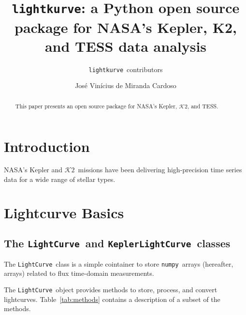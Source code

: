 \documentclass[twocolumn]{aastex62}
\newcommand{\KTWO}{$\mathcal{K}\mathit{2}$}
\newcommand{\lightkurve}{\texttt{lightkurve}}
\newcommand{\LightCurve}{\texttt{LightCurve}}
\newcommand{\KeplerLightCurve}{\texttt{KeplerLightCurve}}
\newcommand{\numpy}{\texttt{numpy}}
\begin{document}
\title{\lightkurve: a Python open source package for NASA's Kepler, K2, and TESS data analysis}


\author{\lightkurve~contributors}

\author{Jos\'e Vin\'icius de Miranda Cardoso}

\begin{abstract}

    This paper presents an open source package for NASA's Kepler, \KTWO, and
    TESS.

\end{abstract}


\section{Introduction} \label{sec:intro}
NASA's Kepler and \KTWO~missions have been delivering high-precision time
series data for a wide range of stellar types.

\section{Lightcurve Basics}

\subsection{The \LightCurve~and \KeplerLightCurve~classes}
        The \LightCurve~class is a simple cointainer to store \numpy~arrays
        (hereafter, arrays) related to flux time-domain measurements.

        The \LightCurve~object provides methods to store, process, and
        convert lightcurves. Table~\ref{tab:methods} contains a description
        of a subset of the methods.
\end{document}

